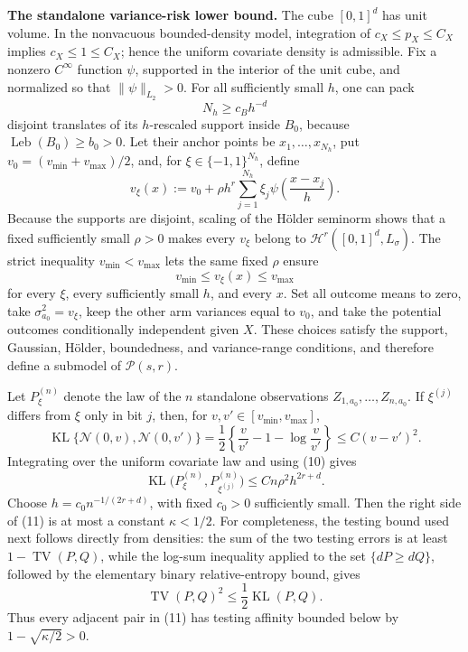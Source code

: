 \textbf{The standalone variance-risk lower bound.}
The cube \([0,1]^d\) has unit volume.  In the nonvacuous bounded-density model, integration of \(c_X\leq p_X\leq C_X\) implies \(c_X\leq1\leq C_X\); hence the uniform covariate density is admissible.  Fix a nonzero \(C^\infty\) function \(\psi\), supported in the interior of the unit cube, and normalized so that \(\|\psi\|_{L_2}>0\).  For all sufficiently small \(h\), one can pack
\[
N_h\geq c_Bh^{-d}
\]
disjoint translates of its \(h\)-rescaled support inside \(B_0\), because \(\operatorname{Leb}(B_0)\geq b_0>0\).  Let their anchor points be \(x_1,\ldots,x_{N_h}\), put \(v_0=(v_{\min}+v_{\max})/2\), and, for \(\xi\in\{-1,1\}^{N_h}\), define
\[
v_\xi(x):=v_0+\rho h^r\sum_{j=1}^{N_h}\xi_j
\psi\left(\frac{x-x_j}{h}\right).
\tag{10}
\]
Because the supports are disjoint, scaling of the Hölder seminorm shows that a fixed sufficiently small \(\rho>0\) makes every \(v_\xi\) belong to \(\mathcal H^r([0,1]^d,L_\sigma)\).  The strict inequality \(v_{\min}<v_{\max}\) lets the same fixed \(\rho\) ensure
\[
v_{\min}\leq v_\xi(x)\leq v_{\max}
\]
for every \(\xi\), every sufficiently small \(h\), and every \(x\).  Set all outcome means to zero, take \(\sigma_{a_0}^2=v_\xi\), keep the other arm variances equal to \(v_0\), and take the potential outcomes conditionally independent given \(X\).  These choices satisfy the support, Gaussian, Hölder, boundedness, and variance-range conditions, and therefore define a submodel of \(\mathcal P(s,r)\).

Let \(P_\xi^{(n)}\) denote the law of the \(n\) standalone observations \(Z_{1,a_0},\ldots,Z_{n,a_0}\).  If \(\xi^{(j)}\) differs from \(\xi\) only in bit \(j\), then, for \(v,v'\in[v_{\min},v_{\max}]\),
\[
\operatorname{KL}\{\mathcal N(0,v),\mathcal N(0,v')\}
=\frac12\left\{\frac{v}{v'}-1-\log\frac{v}{v'}\right\}
\leq C(v-v')^2.
\]
Integrating over the uniform covariate law and using (10) gives
\[
\operatorname{KL}\bigl(P_\xi^{(n)},P_{\xi^{(j)}}^{(n)}\bigr)
\leq Cn\rho^2h^{2r+d}.
\tag{11}
\]
Choose \(h=c_0n^{-1/(2r+d)}\), with fixed \(c_0>0\) sufficiently small.  Then the right side of (11) is at most a constant \(\kappa<1/2\).  For completeness, the testing bound used next follows directly from densities: the sum of the two testing errors is at least \(1-\operatorname{TV}(P,Q)\), while the log-sum inequality applied to the set \(\{dP\geq dQ\}\), followed by the elementary binary relative-entropy bound, gives
\[
\operatorname{TV}(P,Q)^2\leq\frac12\operatorname{KL}(P,Q).
\tag{12}
\]
Thus every adjacent pair in (11) has testing affinity bounded below by \(1-\sqrt{\kappa/2}>0\).

